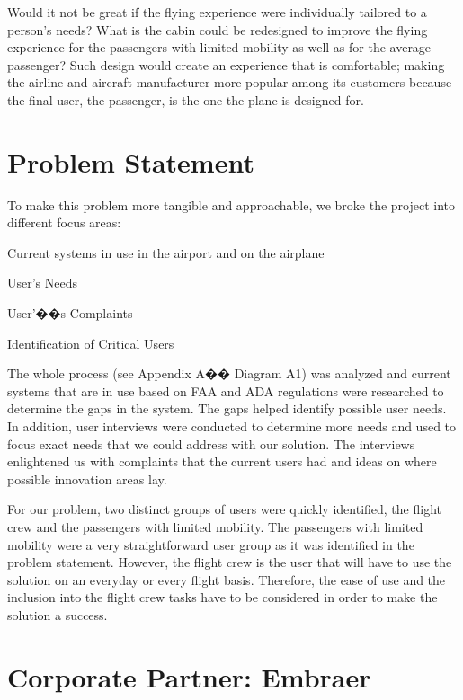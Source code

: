 Would it not be great if the flying experience were individually tailored to a person’s needs? What is the cabin could be redesigned to improve the flying experience for the passengers with limited mobility as well as for the average passenger? Such design would create an experience that is comfortable; making the airline and aircraft manufacturer more popular among its customers because the final user, the passenger, is the one the plane is designed for.

\section{Problem Statement}
To make this problem more tangible and approachable, we broke the project into different focus areas:

\begin{list}{-}{}
  \item Current systems in use in the airport and on the airplane
  \item User's Needs
  \item User'��s Complaints
  \item Identification of Critical Users
\end{list}

The whole process (see Appendix A�� Diagram A1) was analyzed and current systems that are in use based on FAA and ADA regulations were researched to determine the gaps in the system.  The gaps helped identify possible user needs.  In addition, user interviews were conducted to determine more needs and used to focus exact needs that we could address with our solution.  The interviews enlightened us with complaints that the current users had and ideas on where possible innovation areas lay.

For our problem, two distinct groups of users were quickly identified, the flight crew and the passengers with limited mobility.   The passengers with limited mobility were a very straightforward user group as it was identified in the problem statement.  However, the flight crew is the user that will have to use the solution on an everyday or every flight basis.  Therefore, the ease of use and the inclusion into the flight crew tasks have to be considered in order to make the solution a success.

\section{Corporate Partner: Embraer}

